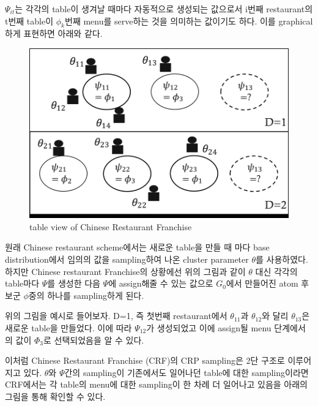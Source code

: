 \documentclass[a4paper]{oblivoir}
\begin{document}
$\Psi_{it}$는 각각의 table이 생겨날 때마다 자동적으로 생성되는 값으로서 i번째 restaurant의 t번째 table이 $\phi_{k}$번째 menu를 serve하는 것을 의미하는 값이기도 하다. 이를 graphical하게 표현하면 아래와 같다.

\begin{figure}[ht] \centering 
\begin{center}
\includegraphics[scale=0.6]{fig13_16.png} 
\caption{table view of Chinese Restaurant Franchise}
\label{fig:13-18}
\end{center}
\end{figure}
원래 Chinese restaurant scheme에서는 새로운 table을 만들 때 마다 base distribution에서 임의의 값을 sampling하여 나온 cluster parameter $\theta$를 사용하였다. 하지만 Chinese restaurant Franchise의 상황에선 위의 그림과 같이  $\theta$ 대신 각각의 table마다 $\Psi$를 생성한 다음 $\Psi$에 assign해줄 수 있는 값으로 $G_{0}$에서 만들어진 atom 후보군 $\phi$중의 하나를 sampling하게 된다. 

위의 그림을 예시로 들어보자. D=1, 즉 첫번째 restaurant에서 $\theta_{11}$과 $\theta_{12}$와 달리 $\theta_{13}$은 새로운 table을 만들었다. 이에 따라 $\Psi_{12}$가 생성되었고 이에 assign될 menu 단계에서의 값이 $\Phi_{3}$로 선택되었음을 알 수 있다. 

이처럼 Chinese Restaurant Franchise (CRF)의 CRP sampling은 2단 구조로 이루어지고 있다. $\theta$와 $\Psi$간의 sampling이 기존에서도 일어나던 table에 대한 sampling이라면 CRF에서는 각 table의 menu에 대한 sampling이 한 차례 더 일어나고 있음을 아래의 그림을 통해 확인할 수 있다. 
\end{document}
